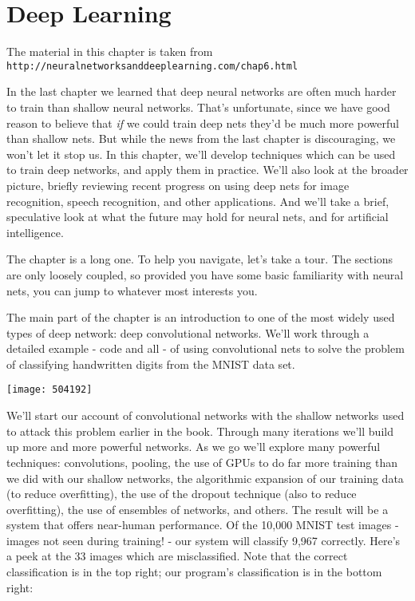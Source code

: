 
\chapter{Deep Learning}
\label{sec:DeepLearning}

The material in this chapter is taken from\\
\lstinline{http://neuralnetworksanddeeplearning.com/chap6.html}

In the last chapter we learned that deep neural networks are often much harder to train than shallow neural networks. That's unfortunate, since we have good reason to believe that \textit{if} we could train deep nets they'd be much more powerful than shallow nets. But while the news from the last chapter is discouraging, we won't let it stop us. In this chapter, we'll develop techniques which can be used to train deep networks, and apply them in practice. We'll also look at the broader picture, briefly reviewing recent progress on using deep nets for image recognition, speech recognition, and other applications. And we'll take a brief, speculative look at what the future may hold for neural nets, and for artificial intelligence.

The chapter is a long one. To help you navigate, let's take a tour. The sections are only loosely coupled, so provided you have some basic familiarity with neural nets, you can jump to whatever most interests you.

The main part of the chapter is an introduction to one of the most widely used types of deep network: deep convolutional networks. We'll work through a detailed example - code and all - of using convolutional nets to solve the problem of classifying handwritten digits from the MNIST data set.

\begin{marginfigure}
    \texttt{[image: 504192]}
    \end{marginfigure}

We'll start our account of convolutional networks with the shallow networks used to attack this problem earlier in the book. Through many iterations we'll build up more and more powerful networks. As we go we'll explore many powerful techniques: convolutions, pooling, the use of GPUs to do far more training than we did with our shallow networks, the algorithmic expansion of our training data (to reduce overfitting), the use of the dropout technique (also to reduce overfitting), the use of ensembles of networks, and others. The result will be a system that offers near-human performance. Of the 10,000 MNIST test images - images not seen during training! - our system will classify 9,967 correctly. Here's a peek at the 33 images which are misclassified. Note that the correct classification is in the top right; our program's classification is in the bottom right:

